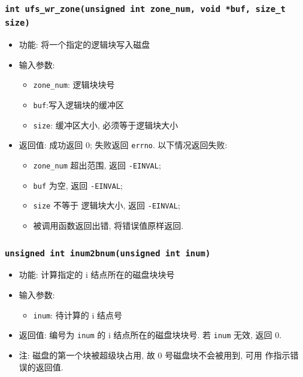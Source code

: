 \documentclass[nofonts]{ctexart}
\begin{document}
  \subsubsection{\texttt{int ufs\_wr\_zone(unsigned int zone\_num, void *buf, size\_t size)}}
  \begin{itemize}
\item
  功能: 将一个指定的逻辑块写入磁盘
\item
  输入参数:

  \begin{itemize}
  \item
    \texttt{zone\_num}: 逻辑块块号
  \item
    \texttt{buf}:写入逻辑块的缓冲区
  \item
    \texttt{size}: 缓冲区大小, 必须等于逻辑块大小
  \end{itemize}
\item
  返回值: 成功返回 0; 失败返回 \texttt{errno}. 以下情况返回失败:

  \begin{itemize}
  \item
    \texttt{zone\_num} 超出范围, 返回 \texttt{-EINVAL};
  \item
    \texttt{buf} 为空, 返回 \texttt{-EINVAL};
  \item
    \texttt{size} 不等于 逻辑块大小, 返回 \texttt{-EINVAL};
  \item
    被调用函数返回出错, 将错误值原样返回.
  \end{itemize}
  \end{itemize}
  \subsubsection{\texttt{unsigned int inum2bnum(unsigned int inum)}}
  \begin{itemize}
\item
  功能: 计算指定的 i 结点所在的磁盘块块号
\item
  输入参数:

  \begin{itemize}
  \item
    \texttt{inum}: 待计算的 i 结点号
  \end{itemize}
\item
  返回值: 编号为 \texttt{inum} 的 i 结点所在的磁盘块块号. 若
  \texttt{inum} 无效, 返回 0.
\item
  注: 磁盘的第一个块被超级块占用, 故 0 号磁盘块不会被用到, 可用
  作指示错误的返回值.
  \end{itemize}
\end{document}
